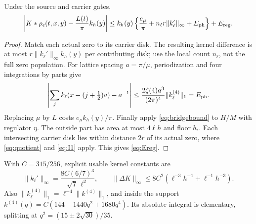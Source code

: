 \begin{theorem}\label{thm:positivefinite}
Under the source and carrier gates,
\begin{equation}
 \left|K*\rho_\epsilon(t,x,y)-\frac{L(t)}{\pi}k_h(y)\right|
 \le k_h(y)\left\{\frac{e_\mu}{\pi}
       +n_\ell r\|k_\ell'\|_\infty+E_{\rm ph}\right\}+E_{\rm reg}.
 \label{eq:positivefinite}
\end{equation}
\end{theorem}
\begin{proof}
Match each actual zero to its carrier disk. The resulting kernel
difference is at most $r\|k_\ell'\|_\infty k_h(y)$ per contributing
disk; use the local count $n_\ell$, not the full zero population.
For lattice spacing $a=\pi/\mu$, periodization and four integrations
by parts give
\[
 \left|\sum_jk_\ell(x-(j+\tfrac12)a)-a^{-1}\right|
 \le \frac{2\zeta(4)a^3}{(2\pi)^4}\|k_\ell^{(4)}\|_1=E_{\rm ph}.
\]
Replacing $\mu$ by $L$ costs $e_\mu k_h(y)/\pi$.
Finally apply \eqref{eq:bridgebound} to $H/M$ with regulator $\eta$.
The outside part has area at most $4\ell h$ and floor $b_*$.
Each intersecting carrier disk lies within distance $2r$ of its
actual zero, where \eqref{eq:quotient} and \eqref{eq:I1} apply.
This gives \eqref{eq:Ereg}.
\end{proof}

With $C=315/256$, explicit usable kernel constants are
\[
 \|k_\ell'\|_\infty=\frac{8C(6/7)^3}{\sqrt7\,\ell^2},\qquad
 \|\Delta K\|_\infty\le8C^2(\ell^{-3}h^{-1}+\ell^{-1}h^{-3}).
\]
Also $\|k_\ell^{(4)}\|_1=\ell^{-4}\|k^{(4)}\|_1$, and inside the
support $k^{(4)}(q)=C(144-1440q^2+1680q^4)$.
Its absolute integral is elementary, splitting at
$q^2=(15\pm2\sqrt{30})/35$.

